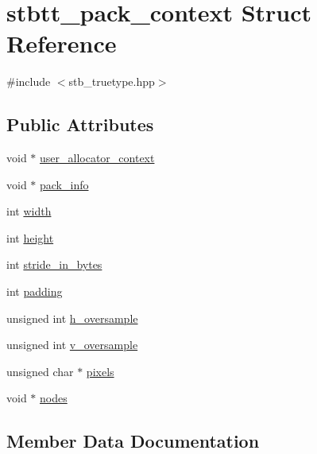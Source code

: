 \hypertarget{structstbtt__pack__context}{}\section{stbtt\+\_\+pack\+\_\+context Struct Reference}
\label{structstbtt__pack__context}


{\ttfamily \#include $<$stb\+\_\+truetype.\+hpp$>$}

\subsection*{Public Attributes}
\begin{DoxyCompactItemize}
\item 
void $\ast$ \hyperlink{structstbtt__pack__context_a45fddc4d4adfcef58aa08ad2874cedc0}{user\+\_\+allocator\+\_\+context}
\item 
void $\ast$ \hyperlink{structstbtt__pack__context_a303a72f0a39479b439fa531925be7031}{pack\+\_\+info}
\item 
int \hyperlink{structstbtt__pack__context_a5da0b7b5d3b82d5fc75ea1c8945183fa}{width}
\item 
int \hyperlink{structstbtt__pack__context_a817ec010d7f09ba9776517c5a87f13a7}{height}
\item 
int \hyperlink{structstbtt__pack__context_abbe9a25aae0e26b81a5f7339fac23801}{stride\+\_\+in\+\_\+bytes}
\item 
int \hyperlink{structstbtt__pack__context_a1191f34fa995910044191584f0d7a803}{padding}
\item 
unsigned int \hyperlink{structstbtt__pack__context_aee1019f9634cad49fa07e8e1f897d6b7}{h\+\_\+oversample}
\item 
unsigned int \hyperlink{structstbtt__pack__context_a4b55efa27ef36e7f258afe92921784c0}{v\+\_\+oversample}
\item 
unsigned char $\ast$ \hyperlink{structstbtt__pack__context_a6549105fd1922df983fbe036b9db4a1a}{pixels}
\item 
void $\ast$ \hyperlink{structstbtt__pack__context_a11a73fa6860e6be1ac039fcca9db2c7c}{nodes}
\end{DoxyCompactItemize}


\subsection{Member Data Documentation}
\hypertarget{structstbtt__pack__context_aee1019f9634cad49fa07e8e1f897d6b7}{}\label{structstbtt__pack__context_aee1019f9634cad49fa07e8e1f897d6b7} 
